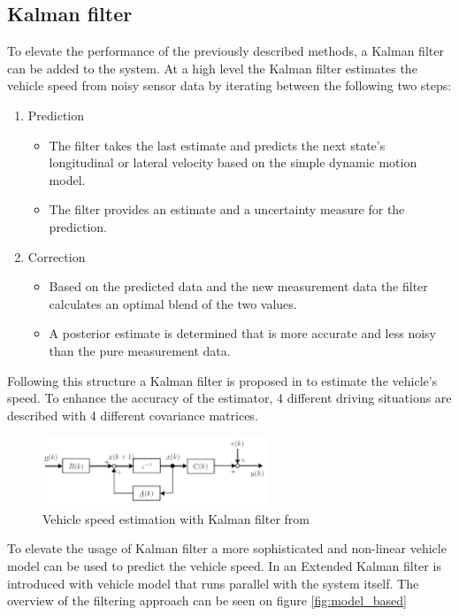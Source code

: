 \subsection{Kalman filter}
To elevate the performance of the previously described methods, a Kalman filter can be added to the system. At a high level the Kalman filter estimates the vehicle speed from noisy sensor data by iterating between the following two steps:
\begin{enumerate}
    \item Prediction
    \begin{itemize}
        \item The filter takes the last estimate and predicts the next state's longitudinal or lateral velocity based on the simple dynamic motion model.
        \item The filter provides an estimate and a uncertainty measure for the prediction.
    \end{itemize}
    \item Correction
    \begin{itemize}
        \item Based on the predicted data and the new measurement data the filter calculates an optimal blend of the two values.
        \item A posterior estimate is determined that is more accurate and less noisy than the pure measurement data. 
    \end{itemize}
\end{enumerate}
Following this structure a Kalman filter is proposed in \cite{lit_for_Kalman_fuzzy} to estimate the vehicle's speed. To enhance the accuracy of the estimator, 4 different driving situations are described with 4 different covariance matrices.
\FloatBarrier
\begin{figure}[ht]
    \centering
    \includegraphics[width=0.6\textwidth]{images/kalman_filter.png}
    \caption{Vehicle speed estimation with Kalman filter from \cite{lit_for_Kalman_fuzzy}}
    \label{fig:kalman_filter}
\end{figure}
\FloatBarrier

To elevate the usage of Kalman filter a more sophisticated and non-linear vehicle model can be used to predict the vehicle speed. In \cite{lit_model_based_est} an Extended Kalman filter is introduced with vehicle model that runs parallel with the system itself. The overview of the filtering approach can be seen on figure \ref{fig:model_based}

